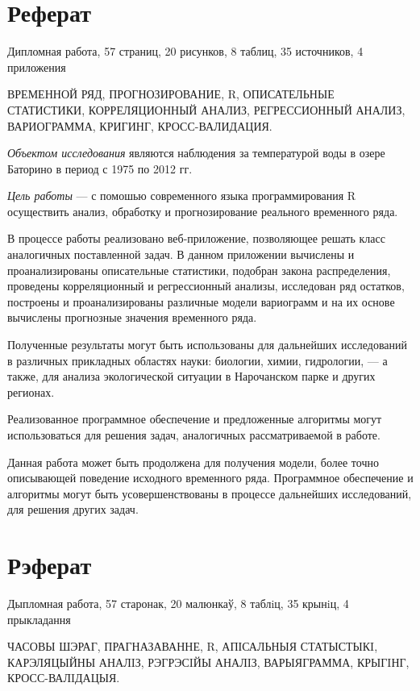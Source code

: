\newpage

\chapter*{Реферат}
Дипломная работа, 57 страниц, 20 рисунков, 8 таблиц, 35 источников, 4 приложения

ВРЕМЕННОЙ РЯД, ПРОГНОЗИРОВАНИЕ, R, ОПИСАТЕЛЬНЫЕ СТАТИСТИКИ, КОРРЕЛЯЦИОННЫЙ АНАЛИЗ, РЕГРЕССИОННЫЙ АНАЛИЗ, ВАРИОГРАММА, КРИГИНГ, КРОСС-ВАЛИДАЦИЯ\@.

\textit{Объектом исследования} являются наблюдения за температурой воды в озере Баторино в период с 1975 по 2012 гг.

\textit{Цель работы} --- с помошью современного языка программирования R осуществить анализ, обработку и прогнозирование реального временного ряда.

В процессе работы реализовано веб-приложение, позволяющее решать класс аналогичных поставленной задач. В данном приложении вычислены и проанализированы описательные статистики, подобран закона распределения, проведены корреляционный и регрессионный анализы, исследован ряд остатков, построены и проанализированы различные модели вариограмм и на их основе вычислены прогнозные значения временного ряда.

Полученные результаты могут быть использованы для дальнейших исследований в различных прикладных областях науки: биологии, химии, гидрологии, --- а также, для анализа экологической ситуации в Нарочанском парке и других регионах.

Реализованное программное обеспечение и предложенные алгоритмы могут использоваться для решения задач, аналогичных рассматриваемой в работе.

Данная работа может быть продолжена для получения модели, более точно описывающей поведение исходного временного ряда. Программное обеспечение и алгоритмы могут быть усовершенствованы в процессе дальнейших исследований, для решения других задач.

\newpage

\chapter*{Рэферат}
Дыпломная работа, 57 старонак, 20 малюнкаў, 8 таблiц, 35 крынiц, 4 прыкладання

ЧАСОВЫ ШЭРАГ, ПРАГНАЗАВАННЕ, R, АПІСАЛЬНЫЯ СТАТЫСТЫКI, КАРЭЛЯЦЫЙНЫ АНАЛIЗ, РЭГРЭСIЙЫ АНАЛIЗ, ВАРЫЯГРАММА, КРЫГIНГ, КРОСС-ВАЛIДАЦЫЯ\@.

